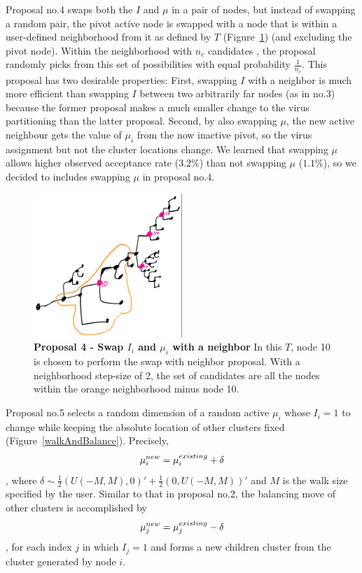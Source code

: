 \documentclass[11pt,oneside,letterpaper]{article}
\begin{document}
Proposal no.4 swaps both the $I$ and $\mu$ in a pair of nodes, but instead of swapping a random pair, the pivot active node is swapped with a node that is within a user-defined neighborhood from it as defined by $T$ (Figure~\ref{multistep}) (and excluding the pivot node).
Within the neighborhood with $n_{c}$ candidates , the proposal randomly picks from this set of possibilities with equal probability $\frac{1}{n_{c}}$.
This proposal has two desirable properties:
First, swapping $I$ with a neighbor is much more efficient than swapping $I$ between two arbitrarily far nodes (as in no.3) because the former proposal makes a much smaller change to the virus partitioning than the latter proposal.
Second, by also swapping $\mu$, the new active neighbour gets the value of $\mu_i$ from the now inactive pivot, so the virus assignment but not the cluster locations change. 
We learned that swapping $\mu$ allows higher observed acceptance rate ($3.2\%$) than not swapping $\mu$ ($1.1\%$), so we decided to includes swapping $\mu$ in proposal no.4.


\begin{figure}[h]
	\centering		
	\includegraphics[width=0.5\textwidth]{figures/multistep}
	\caption{\textbf{Proposal 4 - Swap $I_i$ and $\mu_i$ with a neighbor} 
In this $T$, node 10 is chosen to perform the swap with neighbor proposal. With a neighborhood step-size of 2, the set of candidates are all the nodes within the orange neighborhood minus node 10.
	} 
	\label{multistep} 
\end{figure}



Proposal no.5 selects a random dimension of a random active $\mu_i$ whose $I_i = 1$ to change while keeping the absolute location of other clusters fixed (Figure~\ref{walkAndBalance}). Precisely, 
\begin{equation}
	\mu_i^{new} =  \mu_i^{existing} + \delta \\
\end{equation},
where $\delta \sim \frac{1}{2} (U(-M, M), 0)' + \frac{1}{2} (0, U(-M, M))'$ and $M$ is the walk size specified by the user.
Similar to that in proposal no.2, the balancing move of other clusters is accomplished by
\begin{equation}
	\mu_j^{new} =  \mu_j^{existing} - \delta\\
\label{balance_mu}
\end{equation},
for each index $j$ in which $I_j = 1 $  and forms a new children cluster from the cluster generated by node $i$. 
\end{document}
